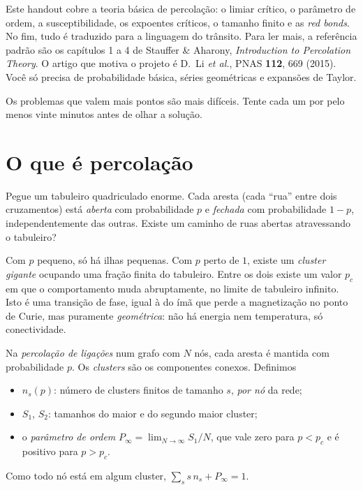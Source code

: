\documentclass[11pt]{article}
\begin{document}
\fazertitulo

Este handout cobre a teoria básica de percolação: o limiar crítico, o parâmetro de ordem, a susceptibilidade, os expoentes críticos, o tamanho finito e as \emph{red bonds}. No fim, tudo é traduzido para a linguagem do trânsito. Para ler mais, a referência padrão são os capítulos 1 a 4 de Stauffer \& Aharony, \emph{Introduction to Percolation Theory}. O artigo que motiva o projeto é D.~Li \emph{et al.}, PNAS \textbf{112}, 669 (2015). Você só precisa de probabilidade básica, séries geométricas e expansões de Taylor.

Os problemas que valem mais pontos são mais difíceis. Tente cada um por pelo menos vinte minutos antes de olhar a solução. 

\section{O que é percolação}

Pegue um tabuleiro quadriculado enorme. Cada aresta (cada ``rua'' entre dois cruzamentos) está \emph{aberta} com probabilidade $p$ e \emph{fechada} com probabilidade $1-p$, independentemente das outras. Existe um caminho de ruas abertas atravessando o tabuleiro?

Com $p$ pequeno, só há ilhas pequenas. Com $p$ perto de $1$, existe um \emph{cluster gigante} ocupando uma fração finita do tabuleiro. Entre os dois existe um valor $p_c$ em que o comportamento muda abruptamente, no limite de tabuleiro infinito. Isto é uma transição de fase, igual à do ímã que perde a magnetização no ponto de Curie, mas puramente \emph{geométrica}: não há energia nem temperatura, só conectividade.

\begin{ideia}
Na \emph{percolação de ligações} num grafo com $N$ nós, cada aresta é mantida com probabilidade $p$. Os \emph{clusters} são os componentes conexos. Definimos
\begin{itemize}
  \item $n_s(p)$: número de clusters finitos de tamanho $s$, \emph{por nó} da rede;
  \item $S_1$, $S_2$: tamanhos do maior e do segundo maior cluster;
  \item o \emph{parâmetro de ordem} $P_\infty = \lim_{N\to\infty} S_1/N$, que vale zero para $p<p_c$ e é positivo para $p>p_c$.
\end{itemize}
Como todo nó está em algum cluster, $\sum_s s\,n_s + P_\infty = 1$.
\end{ideia}
\end{document}
